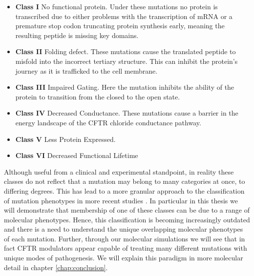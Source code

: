 \begin{itemize}
	\item \textbf{Class I} No functional protein. Under these mutations no protein is transcribed due to either problems with the transcription of mRNA or a premature stop codon truncating protein synthesis early, meaning the resulting peptide is missing key domains. 
	\item \textbf{Class II} Folding defect. These mutations cause the translated peptide to misfold into the incorrect tertiary structure. This can inhibit the protein's journey as it is trafficked to the cell membrane. 
	\item \textbf{Class III} Impaired Gating. Here the mutation inhibits the ability of the protein to transition from the closed to the open state. 
	\item \textbf{Class IV} Decreased Conductance. These mutations cause a barrier in the energy landscape of the CFTR chloride conductance pathway.
	\item \textbf{Class V} Less Protein Expressed.  
	\item \textbf{Class VI} Decreased Functional Lifetime

\end{itemize}

Although useful from a clinical and experimental standpoint, in reality these classes do not reflect that a mutation may belong to many categories at once, to differing degrees. This has lead to a more granular approach to the classification of mutation phenotypes in more recent studies \cite{veit2016}. In particular in this thesis we will demonstrate that membership of one of these classes can be due to a range of molecular phenotypes. Hence, this classification is becoming increasingly outdated and there is a need to understand the unique overlapping molecular phenotypes of each mutation. Further, through our molecular simulations we will see that in fact CFTR modulators appear capable of treating many different mutations with unique modes of pathogenesis. We will explain this paradigm in more molecular detail in chapter \ref{chap:conclusion}.


